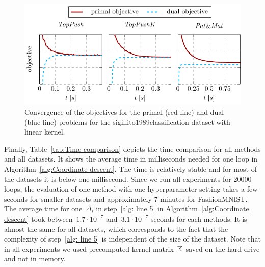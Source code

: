 \begin{figure}[!ht]
  \centering
  \includegraphics[width = \linewidth]{images/dual_results3.pdf}
  \caption{Convergence of the objectives for the primal (red line) and dual (blue line) problems for the sigillito1989classification dataset with linear kernel.}
  \label{fig:Convergence comparison}
\end{figure}

Finally, Table~\ref{tab:Time comparison} depicts the time comparison for all methods and all datasets. It shows the average time in milliseconds needed for one \repeatloop loop in Algorithm~\ref{alg:Coordinate descent}. The time is relatively stable and for most of the datasets it is below one millisecond. Since we run all experiments for 20000 \repeatloop loops, the evaluation of one method with one hyperparameter setting takes a few seconds for smaller datasets and approximately 7 minutes for FashionMNIST. The average time for one~$\Delta_l$ in step~\ref{alg: line 5} in Algorithm~\ref{alg:Coordinate descent} took between~$1.7\cdot 10^{-7}$ and~$3.1\cdot 10^{-7}$ seconds for each methods. It is almost the same for all datasets, which corresponds to the fact that the complexity of step~\ref{alg: line 5} is independent of the size of the dataset. Note that in all experiments we used precomputed kernel matrix~$\mathbb{K}$ saved on the hard drive and not in memory.

